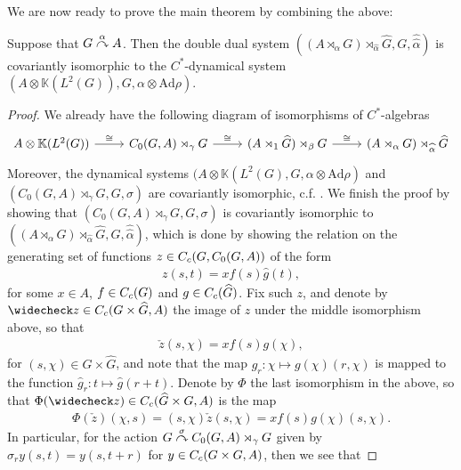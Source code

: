 We are now ready to prove the main theorem by combining the above:
\begin{theorem}
Suppose that $G \stackrel{\alpha}{\curvearrowright} A$. Then the double dual system $\left( (A \rtimes_\alpha G) \rtimes_{\hat \alpha} \hat G, G, \hat{\hat{\alpha}} \right)$ is covariantly isomorphic to the $C^*$-dynamical system $(A \otimes \mathbb{K}(L^2(G)), G, \alpha \otimes \mathrm{Ad} \rho)$.	
\label{takai:takai}
\end{theorem}
\begin{proof}
We already have the following diagram of isomorphisms of $C^*$-algebras
\begin{equation*}
	\begin{tikzcd}
		A \otimes \mathbb{K}(L^2(G)) \ar[r,"\cong"] & C_0(G,A) \rtimes_{\gamma} G \ar[r, "\cong"] & (A \rtimes_1 \hat G) \rtimes_\beta G \ar[r, "\cong"] & (A \rtimes_\alpha G) \rtimes_{\hat \alpha} \hat G
	\end{tikzcd}
\end{equation*}
Moreover, the dynamical systems $(A \otimes \mathbb{K}(L^2(G), G, \alpha \otimes \mathrm{Ad} \rho)$ and $(C_0(G,A) \rtimes_{\gamma} G, G, \sigma)$ are covariantly isomorphic, c.f. . We finish the proof by showing that $(C_0(G,A) \rtimes_{\gamma} G, G, \sigma)$ is covariantly isomorphic to $( (A \rtimes_{\alpha} G)\rtimes_{\hat \alpha} \hat G, G, \hat{\hat{\alpha}})$, which is done by showing the relation on the generating set of functions $z \in C_c(G,C_0(G,A))$ of the form
\begin{align*}
	z(s,t) =x f(s) \hat g(t),
\end{align*}
for some $x \in A$, $f \in C_c(G)$ and $g \in C_c(\widehat{G})$. Fix such $z$, and denote by $\check z \in \cc(G \times \hat G, A)$ the image of $z$ under the middle isomorphism above, so that
\begin{align*}
	\check z(s,\chi) = x f(s) g(\chi),
\end{align*}
for $(s,\chi) \in G \times \hat G$, and note that the map $g_r \colon \chi \mapsto g(\chi)(r,\chi)$ is mapped to the function $\hat g_r \colon t \mapsto \hat g(r+t)$. Denote by $\Phi$ the last isomorphism in the above, so that $\Phi(\check z) \in \cc(\hat G\times  G, A)$ is the map
\begin{align*}
	\Phi(\check z)(\chi,s) = (s,\chi) \check z(s,\chi) = x f(s) g(\chi) (s,\chi).
\end{align*}
In particular, for the action $G \stackrel{\sigma}{\curvearrowright} C_0(G,A) \rtimes_{\gamma} G$ given by $\sigma_r y(s,t) = y(s,t+r)$ for $y \in C_c(G \times G,A)$, then we see that

\end{proof}
